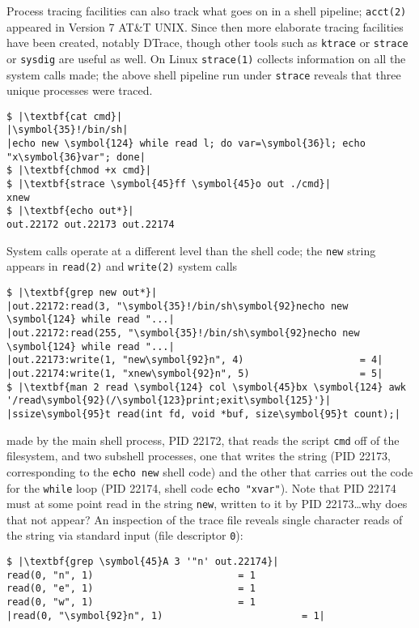 \documentclass[10pt,a4paper]{article}
\begin{document}
Process tracing facilities can also track what goes on in a shell
pipeline; \texttt{acct(2)} appeared in Version 7 AT\&T UNIX. Since then
more elaborate tracing facilities have been created, notably DTrace,
though other tools such as \texttt{ktrace} or \texttt{strace} or
\texttt{sysdig} are useful as well. On Linux \texttt{strace(1)} collects
information on all the system calls made; the above shell pipeline run
under \texttt{strace} reveals that three unique processes were traced.

\begin{lstlisting}
$ |\textbf{cat cmd}|
|\symbol{35}!/bin/sh|
|echo new \symbol{124} while read l; do var=\symbol{36}l; echo "x\symbol{36}var"; done|
$ |\textbf{chmod +x cmd}|
$ |\textbf{strace \symbol{45}ff \symbol{45}o out ./cmd}|
xnew
$ |\textbf{echo out*}|
out.22172 out.22173 out.22174
\end{lstlisting}

System calls operate at a different level than the shell code; the
\texttt{new} string appears in \texttt{read(2)} and \texttt{write(2)}
system calls

\begin{lstlisting}
$ |\textbf{grep new out*}|
|out.22172:read(3, "\symbol{35}!/bin/sh\symbol{92}necho new \symbol{124} while read "...|
|out.22172:read(255, "\symbol{35}!/bin/sh\symbol{92}necho new \symbol{124} while read "...|
|out.22173:write(1, "new\symbol{92}n", 4)                    = 4|
|out.22174:write(1, "xnew\symbol{92}n", 5)                   = 5|
$ |\textbf{man 2 read \symbol{124} col \symbol{45}bx \symbol{124} awk '/read\symbol{92}(/\symbol{123}print;exit\symbol{125}'}|
|ssize\symbol{95}t read(int fd, void *buf, size\symbol{95}t count);|
\end{lstlisting}

made by the main shell process, PID 22172, that reads the script
\texttt{cmd} off of the filesystem, and two subshell processes, one that
writes the string (PID 22173, corresponding to the \texttt{echo new}
shell code) and the other that carries out the code for the
\texttt{while} loop (PID 22174, shell code \texttt{echo
"xvar"}). Note that PID 22174 must at some point read in the
string \texttt{new}, written to it by PID 22173\ldots why does that not
appear? An inspection of the trace file reveals single character reads
of the string via standard input (file descriptor \texttt{0}):

\clearpage
\begin{lstlisting}
$ |\textbf{grep \symbol{45}A 3 '"n' out.22174}|
read(0, "n", 1)                         = 1
read(0, "e", 1)                         = 1
read(0, "w", 1)                         = 1
|read(0, "\symbol{92}n", 1)                        = 1|
\end{lstlisting}
\end{document}
